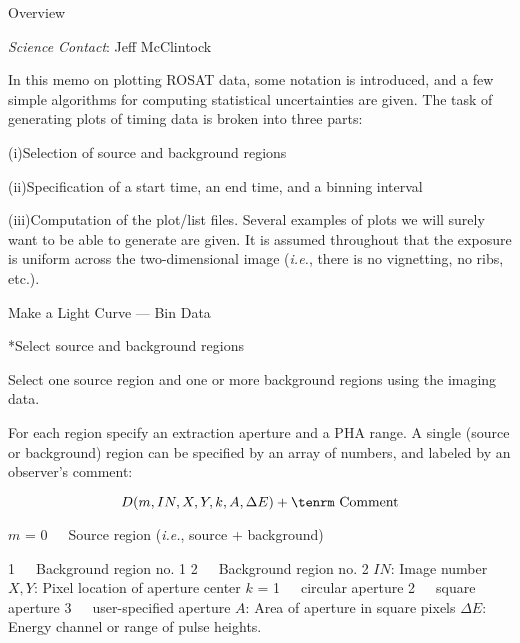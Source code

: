 %
\def\version{\it Rev. 1.1 --- 4/1/86}
\def\chapter{\it Timing Analysis: Light Curves}

\@{Overview}

\noindent
{\it Science Contact}:  Jeff McClintock

In this memo on plotting ROSAT data,
some notation is introduced,  and a few simple algorithms for
computing statistical uncertainties are given. The task of
generating plots of timing data is broken into three parts:
\item{(i)}Selection of
source and background regions
\item{(ii)}Specification of a start time, an
end time, and a binning interval
\item{(iii)}Computation of the plot/list
files.
Several examples of plots we will surely want to be
able to generate are given.  It is assumed throughout that the exposure is
uniform across the two-dimensional image ({\it i.e.}, there is no
vignetting, no ribs, etc.).

\@{Make a Light Curve --- Bin Data}

\**Select source and background regions

{\list

Select one source region and one or more background regions using
the imaging data.

For each region specify an extraction aperture and
a PHA range.  A single (source or background) region can be specified
by an array of numbers, and labeled by an observer's comment:

}

$$D ( m, IN, X, Y, k, A, \Delta E) + {\rm~ Comment}$$

$m$ = 0~~~Source region ({\it i.e.}, source + background)

\itemitem{\phantom{1.}}\phantom{$m$ = }1~~~Background region no. 1
\itemitem{\phantom{1.}}\phantom{$m$ = }2~~~Background region no. 2
\itemitem{\phantom{1.}}\phantom{$m$ = }{\it etc.}
$IN$:  Image number
$X,Y$:  Pixel location of aperture center
$k$ = 1~~~circular aperture
\itemitem{\phantom{4.}}\phantom{$k$ = }2~~~square aperture
\itemitem{\phantom{4.}}\phantom{$k$ = }3~~~user-specified aperture
$A$:  Area of aperture in square pixels
$\Delta E$:  Energy channel or range of pulse heights.


